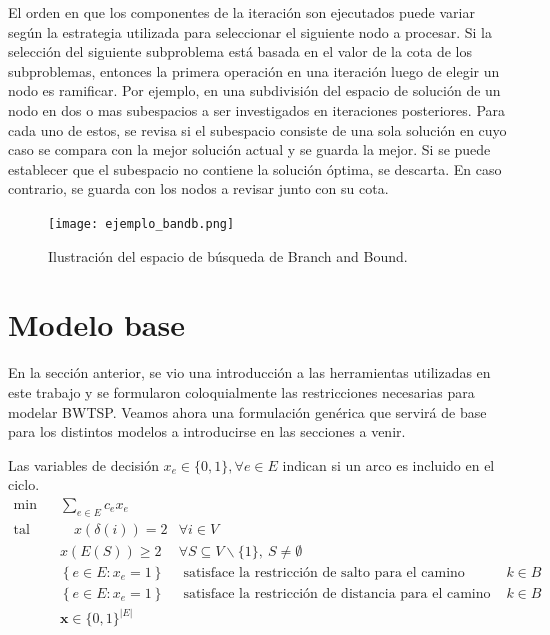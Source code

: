 \documentclass[10pt, a4paper]{article}
\theoremstyle{definition}
\begin{document}
El orden en que los componentes de la iteración son ejecutados puede variar según la estrategia utilizada para seleccionar el siguiente nodo a procesar.
Si la selección del siguiente subproblema está basada en el valor de la cota de los subproblemas, entonces la primera operación en una iteración luego de elegir un nodo es ramificar.
Por ejemplo, en una subdivisión del espacio de solución de un nodo en dos o mas subespacios a ser investigados en iteraciones posteriores.
Para cada uno de estos, se revisa si el subespacio consiste de una sola solución en cuyo caso se compara con la mejor solución actual y se guarda la mejor.
Si se puede establecer que el subespacio no contiene la solución óptima, se descarta. En caso contrario, se guarda con los nodos a revisar junto con su cota.
 
\begin{figure}[H]
  \centering
  \texttt{[image: ejemplo\_bandb.png]}
  \caption{Ilustración del espacio de búsqueda de Branch and Bound.}
  \label{fig:ejemplo_bandb}
\end{figure}

\section{Modelo base}
\label{sec:modelo_base}

En la sección anterior, se vio una introducción a las herramientas utilizadas en este trabajo y se formularon coloquialmente las restricciones necesarias para modelar BWTSP. Veamos ahora una formulación genérica que servirá de base para los distintos modelos a introducirse en las secciones a venir.

Las variables de decisión $x_e \in \{0,1\}, \forall e \in E$ indican si un arco es incluido en el ciclo.
\begin{align} 
	\min & \sum_{e \in E} c_{e} x_{e} & \label{eq:1} \\
	\text {tal que} & \quad x(\delta(i))=2 & \forall i \in V \label{eq:2} \\
	& x(E(S)) \geq 2 & \forall S \subseteq V \backslash\{1\},\ S \neq \emptyset \label{eq:3} \\
	& \left\{e \in E : x_{e}=1\right\} & \text { satisface la restricción de salto para el camino después de cada } k \in B \label{eq:4} \\
	& \left\{e \in E : x_{e}=1\right\} & \text { satisface la restricción de distancia para el camino después de cada } k \in B \label{eq:5} \\
	& \mathbf{x} \in\{0,1\}^{|E|} & \label{eq:6}
\end{align}
\end{document}
